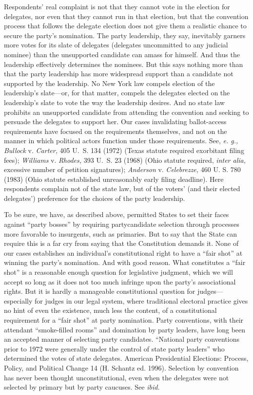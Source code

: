   Respondents' real complaint is not that they cannot vote in the election for delegates, nor even that they cannot run \newpage  in that election, but that the convention process that follows the delegate election does not give them a realistic chance to secure the party's nomination. The party leadership, they say, inevitably garners more votes for its slate of delegates (delegates uncommitted to any judicial nominee) than the unsupported candidate can amass for himself. And thus the leadership effectively determines the nominees. But this says nothing more than that the party leadership has more widespread support than a candidate not supported by the leadership. No New York law compels election of the leadership's slate---or, for that matter, compels the delegates elected on the leadership's slate to vote the way the leadership desires. And no state law prohibits an unsupported candidate from attending the convention and seeking to persuade the delegates to support her. Our cases invalidating ballot-access requirements have focused on the requirements themselves, and not on the manner in which political actors function under those requirements. See, \emph{e. g., Bullock} v. \emph{Carter,} 405 U.~S. 134 (1972) (Texas statute required exorbitant filing fees); \emph{Williams} v. \emph{Rhodes,} 393 U.~S. 23 (1968) (Ohio statute required, \emph{inter alia,} excessive number of petition signatures); \emph{Anderson} v. \emph{Celebrezze,} 460 U. S. 780 (1983) (Ohio statute established unreasonably early filing deadline). Here respondents complain not of the state law, but of the voters' (and their elected delegates') preference for the choices of the party leadership.

  To be sure, we have, as described above, permitted States to set their faces against ``party bosses'' by requiring partycandidate selection through processes more favorable to insurgents, such as primaries. But to say that the State can require this is a far cry from saying that the Constitution demands it. None of our cases establishes an individual's constitutional right to have a ``fair shot'' at winning the party's nomination. And with good reason. What constitutes a ``fair shot'' is a reasonable enough question for legislative judgment, which we will accept so long as it does not too \newpage  much infringe upon the party's associational rights. But it is hardly a manageable constitutional question for judges---especially for judges in our legal system, where traditional electoral practice gives no hint of even the existence, much less the content, of a constitutional requirement for a ``fair shot'' at party nomination. Party conventions, with their attendant ``smoke-filled rooms'' and domination by party leaders, have long been an accepted manner of selecting party candidates. ``National party conventions prior to 1972 were generally under the control of state party leaders'' who determined the votes of state delegates. American Presidential Elections: Process, Policy, and Political Change 14 (H. Schantz ed. 1996). Selection by convention has never been thought unconstitutional, even when the delegates were not selected by primary but by party caucuses. See \emph{ibid.}

